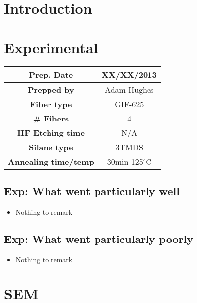 \section{Introduction}

\section{Experimental}


\begin{center}
\begin{tabular}{| c | c |}
 \hline
 {\bf Prep. Date} & XX/XX/2013 \\ \hline
 {\bf Prepped by} & Adam Hughes \\ \hline

 {\bf Fiber type} & GIF-625 \\ \hline
 {\bf \# Fibers} & 4  \\ \hline
 {\bf HF Etching time} & N/A \\ \hline
 {\bf Silane type} & 3TMDS \\ \hline
 {\bf Annealing time/temp} & 30min 125$^\circ$C  \\ \hline
\end{tabular}
\end{center}

\vspace{.3cm}


\subsection{Exp: {\color{blue} What went particularly well}}

\begin{itemize}
\item{Nothing to remark}
\end{itemize}

\subsection{Exp: {\color{red} What went particularly poorly}}

\begin{itemize}
\item{Nothing to remark}
\end{itemize}

\section{SEM}

